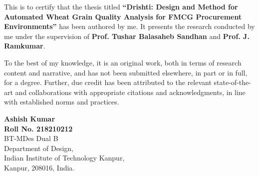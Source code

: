 \documentclass[12pt, a4paper, twoside, openright]{Thesis} %
\begin{document}
This is to certify that the thesis titled \textbf{“Drishti: Design and Method for Automated Wheat Grain Quality Analysis for FMCG Procurement Environments”} has been authored by me.
It presents the research conducted by me under the supervision of \textbf{Prof. Tushar Balasaheb Sandhan} and \textbf{Prof. J. Ramkumar}.\par

To the best of my knowledge, it is an original work, both in terms of research content and narrative, and has not been submitted elsewhere, in part or in full, for a degree.
Further, due credit has been attributed to the relevant state-of-the-art and collaborations with appropriate citations and acknowledgments, in line with established norms and practices.
\bigskip
\bigskip
\bigskip
\bigskip

\begin{flushright}
   \vspace{2mm}
\textbf{Ashish Kumar} \\
\textbf{Roll No. 218210212} \\
BT-MDes Dual B\\ 
Department of Design, \\
Indian Institute of Technology Kanpur,\\
Kanpur, 208016, India.
\end{flushright}
\end{document}
